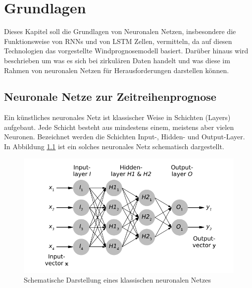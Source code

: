 \documentclass[
12pt, %
toc=listofnumbered, %
toc=chapterentrydotfill, %
numbers=noenddot, %
captions=tableheading, %
bibliography=numbered
]{scrreprt}
\let\Oldsection\section
\renewcommand{\section}{\FloatBarrier\Oldsection}
\begin{document}
\chapter{Grundlagen}
Dieses Kapitel soll die Grundlagen von Neuronalen Netzen, insbesondere die Funktionsweise von RNNs und von LSTM Zellen, vermitteln, da auf diesen Technologien das vorgestellte Windprognosemodell basiert. 
Darüber hinaus wird beschrieben um was es sich bei zirkulären Daten handelt und was diese im Rahmen von neuronalen Netzen für Herausforderungen darstellen können.

\section{Neuronale Netze zur Zeitreihenprognose}

Ein künstliches neuronales Netz ist klassischer Weise in Schichten (Layers) aufgebaut. Jede Schicht besteht aus mindestens einem, meistens aber vielen Neuronen. Bezeichnet werden die Schichten Input-, Hidden- und Output-Layer. In Abbildung \ref{fig:nn} ist ein solches neuronales Netz schematisch dargestellt.

\begin{figure}[tph]
	\begin{center}
		\includegraphics[width=0.6\linewidth]{./images/knn_allg.pdf}
		\caption{Schematische Darstellung eines klassischen neuronalen Netzes}
		\label{fig:nn}
	\end{center}
\end{figure}
\end{document}
